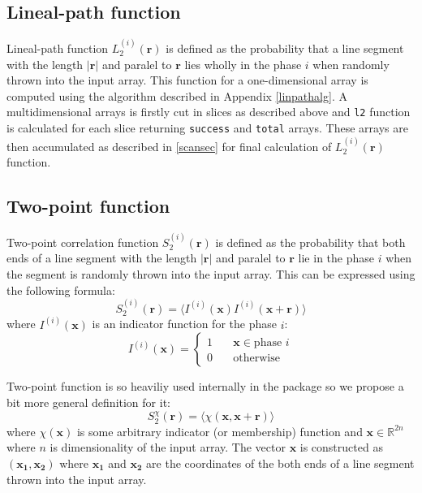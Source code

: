 \documentclass[reprint,amsmath,amssymb,aps,pre]{revtex4-1}
\newcommand{\code}[1]{\colorbox{light-gray}{\texttt{#1}}}
\newcommand{\apref}[1]{Appendix \ref{#1}}
\begin{document}
\subsection{Lineal-path function}
Lineal-path function $L_2^{(i)}(\bm{r})$ is defined as the probability that a
line segment with the length $|\bm{r}|$ and paralel to $\bm{r}$ lies wholly in
the phase $i$ when randomly thrown into the input array. This function for a
one-dimensional array is computed using the algorithm described in
\apref{linpathalg}. A multidimensional arrays is firstly cut in slices as
described above and \code{l2} function is calculated for each slice returning
\code{success} and \code{total} arrays. These arrays are then accumulated as
described in \cref{scansec} for final calculation of $L_2^{(i)}(\bm{r})$
function.

\subsection{Two-point function}
Two-point correlation function $S_2^{(i)}(\bm{r})$ is defined as the probability
that both ends of a line segment with the length $|\bm{r}|$ and paralel to
$\bm{r}$ lie in the phase $i$ when the segment is randomly thrown into the input
array. This can be expressed using the following formula:
\begin{equation*}
  S_2^{(i)}(\bm{r}) = \langle I^{(i)}(\bm{x}) I^{(i)}(\bm{x} + \bm{r}) \rangle
\end{equation*}
where $I^{(i)}(\bm{x})$ is an indicator function for the phase $i$:
\begin{equation*}
I^{(i)}(\bm{x}) = \left\{
\begin{array}{ll}
  1 & \quad \bm{x} \in \text{phase $i$} \\
  0 & \quad \text{otherwise}
\end{array}
\right.
\end{equation*}

Two-point function is so heaviliy used internally in the package so we propose a
bit more general definition for it:
\begin{equation*}
  S_2^{\chi}(\bm{r}) = \langle \chi(\bm{x}, \bm{x} + \bm{r}) \rangle
\end{equation*}
where $\chi(\bm{x})$ is some arbitrary indicator (or membership) function and
$\bm{x} \in \mathbb{R}^{2n}$ where $n$ is dimensionality of the input array. The
vector $\bm{x}$ is constructed as $(\bm{x_1}, \bm{x_2})$ where $\bm{x_1}$ and
$\bm{x_2}$ are the coordinates of the both ends of a line segment thrown into
the input array.
\end{document}
